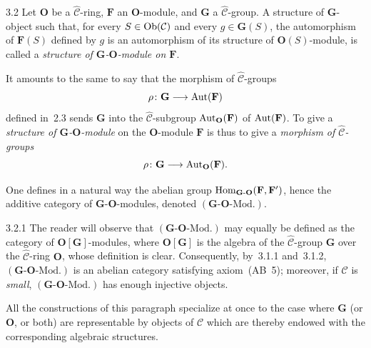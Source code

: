 \begin{definition}{3.2}\label{I.3.2}
Let \(\mathbf{O}\) be a \(\widehat{\mathcal{C}}\)-ring, \(\mathbf{F}\) an
\(\mathbf{O}\)-module, and \(\mathbf{G}\) a \(\widehat{\mathcal{C}}\)-group.
A structure of \(\mathbf{G}\)-object such that, for every
\(S\in\operatorname{Ob}(\mathcal{C})\) and every \(g\in\mathbf{G}(S)\), the automorphism of
\(\mathbf{F}(S)\) defined by \(g\) is an automorphism of its structure of
\(\mathbf{O}(S)\)-module, is called a \emph{structure of
\(\mathbf{G}\)-\(\mathbf{O}\)-module on \(\mathbf{F}\)}.

It amounts to the same to say that the morphism of
\(\widehat{\mathcal{C}}\)-groups
\[
\rho\colon\mathbf{G}\longrightarrow\operatorname{Aut}(\mathbf{F})
\]
defined in~2.3 sends \(\mathbf{G}\) into the
\(\widehat{\mathcal{C}}\)-subgroup \(\operatorname{Aut}_{\mathbf{O}}(\mathbf{F})\) of
\(\operatorname{Aut}(\mathbf{F})\). To give a \emph{structure of
\(\mathbf{G}\)-\(\mathbf{O}\)-module} on the \(\mathbf{O}\)-module
\(\mathbf{F}\) is thus to give a \emph{morphism of
\(\widehat{\mathcal{C}}\)-groups}
\[
\rho\colon\mathbf{G}\longrightarrow\operatorname{Aut}_{\mathbf{O}}(\mathbf{F}).
\]

One defines in a natural way the abelian group
\(\operatorname{Hom}_{\mathbf{G}\text{-}\mathbf{O}}(\mathbf{F},\mathbf{F}')\), hence the
additive category of \(\mathbf{G}\)-\(\mathbf{O}\)-modules, denoted
\((\mathbf{G}\text{-}\mathbf{O}\text{-Mod.})\).
\end{definition}

\begin{remark}{3.2.1}\label{I.3.2.1}
The reader will observe that \((\mathbf{G}\text{-}\mathbf{O}\text{-Mod.})\)
may equally be defined as the category of
\(\mathbf{O}[\mathbf{G}]\)-modules, where \(\mathbf{O}[\mathbf{G}]\) is the
algebra of the \(\widehat{\mathcal{C}}\)-group \(\mathbf{G}\) over the
\(\widehat{\mathcal{C}}\)-ring \(\mathbf{O}\), whose definition is
clear.
Consequently, by~3.1.1 and~3.1.2,
\((\mathbf{G}\text{-}\mathbf{O}\text{-Mod.})\) is an abelian category
satisfying axiom~(AB~5); moreover, if \(\mathcal{C}\) is \emph{small},
\((\mathbf{G}\text{-}\mathbf{O}\text{-Mod.})\) has enough injective objects.
\end{remark}

All the constructions of this paragraph specialize at once to the case where
\(\mathbf{G}\) (or \(\mathbf{O}\), or both) are representable by objects of
\(\mathcal{C}\) which are thereby endowed with the corresponding algebraic
structures.

